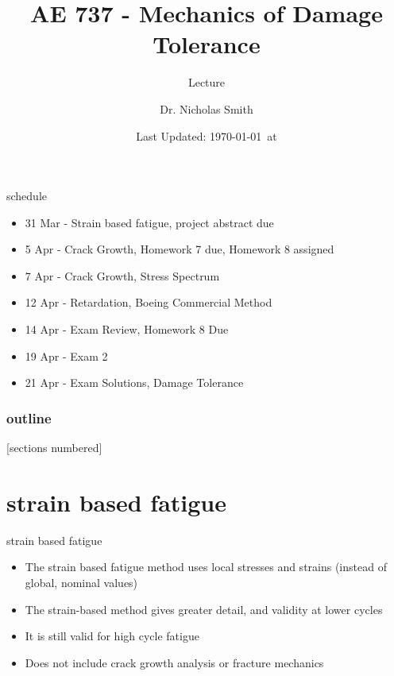 \documentclass[10pt]{beamer}
\title{AE 737 - Mechanics of Damage Tolerance}
\subtitle{Lecture \arabic{lecture}}
\date{Last Updated: \today\ at \DTMcurrenttime}
\author{Dr. Nicholas Smith}
\institute{Wichita State University, Department of Aerospace Engineering}
\begin{document}
\maketitle
\begin{frame}{schedule}
	\begin{itemize}
		\item 31 Mar - Strain based fatigue, project abstract due
		\item 5 Apr - Crack Growth, Homework 7 due, Homework 8 assigned
		\item 7 Apr - Crack Growth, Stress Spectrum
		\item 12 Apr - Retardation, Boeing Commercial Method
		\item 14 Apr - Exam Review, Homework 8 Due
		\item 19 Apr - Exam 2
		\item 21 Apr - Exam Solutions, Damage Tolerance
	\end{itemize}
\end{frame}

\begin{frame}
  \frametitle{outline}
  [sections numbered]
  \tableofcontents[hideallsubsections]
\end{frame}

\section{strain based fatigue}

\begin{frame}{strain based fatigue}
	\begin{itemize}[<+->]
		\item The strain based fatigue method uses local stresses and strains (instead of global, nominal values)
		\item The strain-based method gives greater detail, and validity at lower cycles
		\item It is still valid for high cycle fatigue
		\item Does not include crack growth analysis or fracture mechanics
	\end{itemize}
\end{frame}
\end{document}

